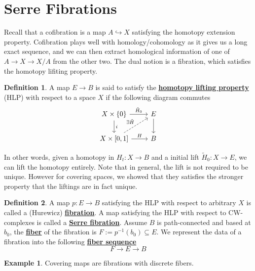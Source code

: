 \documentclass{article}
\theoremstyle{definition}
\theoremstyle{definition}
\theoremstyle{definition}
\theoremstyle{definition}
\newtheorem{definition}{Definition}[theorem]
\theoremstyle{definition}
\theoremstyle{definition}
\newtheorem{example}{Example}[theorem]
\begin{document}
\section{Serre Fibrations}
Recall that a cofibration is a map $A\hookrightarrow X$ satisfying the homotopy extension property. Cofibration plays well with homology/cohomology as it gives us a long exact sequence, and we can then extract homological information of one of $A\to X\to X/A$ from the other two. The dual notion is a fibration, which satisfies the homotopy lifiting property.

\begin{tcolorbox}[colback=purple!5!white,colframe=purple!75!black]
\begin{definition}
A map $E\to B$ is said to satisfy the \underline{\textbf{homotopy lifting property}} (HLP) with respect to a space $X$ if the following diagram commutes
\[
\begin{tikzcd}
X\times \{0\}\arrow[r,"\tilde{H}_0"]\arrow[d,"i"]&E\arrow[d]\\
X\times [0,1]\arrow[r,"H"]\arrow[ur,dashed,"\exists \tilde{H}"]&B
\end{tikzcd}    
\]
\end{definition}
\end{tcolorbox}
In other words, given a homotopy in $H_t: X\to B$ and a initial lift $\tilde{H}_0: X\to E$, we can lift the homotopy entirely. Note that in general, the lift is not required to be unique. However for covering spaces, we showed that they satisfies the stronger property that the liftings are in fact unique. 

\begin{tcolorbox}[colback=purple!5!white,colframe=purple!75!black]
\begin{definition}
A map $p:E\to B$ satisfying the HLP with respect to arbitrary $X$ is called a (Hurewicz)  \underline{\textbf{fibration}}. A map satisfying the HLP with respect to CW-complexes is called a \underline{\textbf{Serre fibration}}. Assume $B$ is path-connected and based at $b_0$, the \underline{\textbf{fiber}} of the fibration is $F:=p^{-1}(b_0)\subseteq E$. We represent the data of a fibration into the following \underline{\textbf{fiber sequence}}
\[F\to E\to B\]
\end{definition}
\end{tcolorbox}

\begin{tcolorbox}[colback=yellow!5!white,colframe=yellow!30!white]
\begin{example}
	Covering maps are fibrations with discrete fibers.
\end{example}
\end{tcolorbox}
\end{document}
